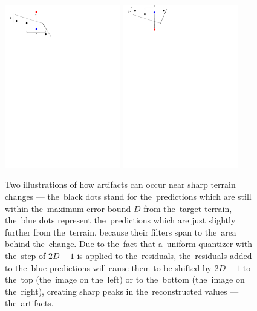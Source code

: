 \begin{figure}
	\includegraphics[trim={0 24cm 13cm 1cm}, clip, width=0.45\textwidth]{figures/artifs_theory.pdf}\centering
	\includegraphics[trim={0 24cm 13cm 0}, clip, width=0.45\textwidth]{figures/artifs_theory2.pdf}\centering
	\caption{Two illustrations of how artifacts can occur near sharp terrain changes --- the~black dots stand for the~predictions which are still within the~maximum-error bound $D$ from the~target terrain, the~blue dots represent the~predictions which are just slightly further from the~terrain, because their filters span to the~area behind the~change. Due to the~fact that a~uniform quantizer with the~step of $2D-1$ is applied to the~residuals, the~residuals added to the~blue predictions will cause them to be shifted by $2D - 1$ to the~top (the~image on the~left) or to the~bottom (the~image on the~right), creating sharp peaks in the~reconstructed values --- the~artifacts.}
	\label{fig:artifs_theory}
\end{figure}

